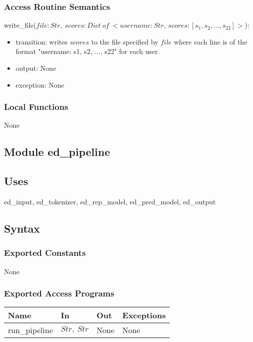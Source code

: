 \documentclass[12pt, titlepage]{article}
\begin{document}
\subsubsection{Access Routine Semantics}

\noindent write\_file($file: Str,\ scores: Dict\ of\ <username: Str,\ scores: [s_1, s_2, ..., s_{22}]>$):
\begin{itemize}
\item transition: writes $scores$ to the file specified by $file$ where each line is of the format "username: s1, s2, ..., s22" for each user.
\item output: None
\item exception: None
\end{itemize}

\subsubsection{Local Functions}

None


\subsection{Module ed\_pipeline}

\subsection{Uses}

ed\_input, ed\_tokenizer, ed\_rep\_model, ed\_pred\_model, ed\_output

\subsection{Syntax}

\subsubsection{Exported Constants}

None

\subsubsection{Exported Access Programs}

\begin{center}
\begin{tabular}{p{3cm} p{4cm} p{4cm} p{3cm}}
\hline
\textbf{Name} & \textbf{In} & \textbf{Out} & \textbf{Exceptions} \\
\hline
run\_pipeline & $Str,\ Str$ & None & None \\
\hline
\end{tabular}
\end{center}
\end{document}
